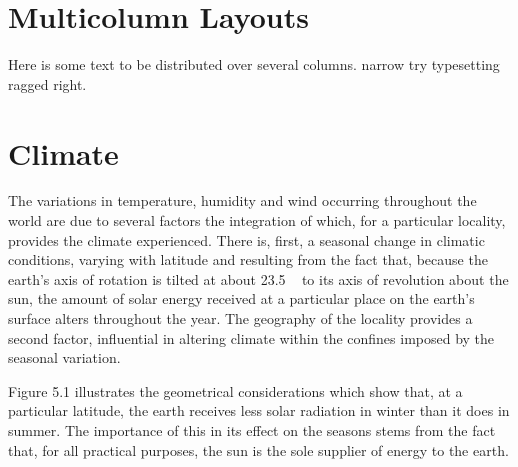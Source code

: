 \chapter{Multicolumn Layouts}
\begin{multicols}{2}
Here is some text to be distributed over
several columns. 
narrow try typesetting ragged right.
\lipsum
\end{multicols}

\chapter{Climate}
The variations in temperature, humidity and wind occurring throughout the world are due
to several factors the integration of which, for a particular locality, provides the climate
experienced. There is, first, a seasonal change in climatic conditions, varying with latitude
and resulting from the fact that, because the earth's axis of rotation is tilted at about 23.5 ~
to its axis of revolution about the sun, the amount of solar energy received at a particular
place on the earth's surface alters throughout the year. The geography of the locality
provides a second factor, influential in altering climate within the confines imposed by the
seasonal variation.

Figure 5.1 illustrates the geometrical considerations which show that, at a particular
latitude, the earth receives less solar radiation in winter than it does in summer. The
importance of this in its effect on the seasons stems from the fact that, for all practical
purposes, the sun is the sole supplier of energy to the earth.

